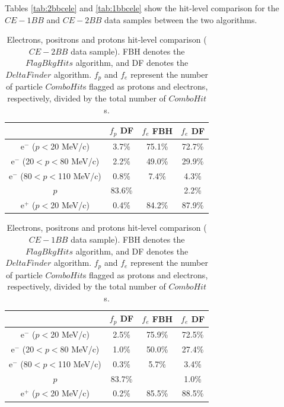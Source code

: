 Tables \ref{tab:2bbcele} and \ref{tab:1bbcele} show the hit-level 
comparison for the $CE-1BB$ and $CE-2BB$ data samples between the two algorithms.
\begin{center}
    \begin{table}[h!]
    \centering
    \renewcommand{\arraystretch}{1.}
    \begin{tabular}{| c | c | c | c |} 
    \hline
    &    $f_{p}$ DF & $f_{e}$ FBH  & $f_{e}$ DF \\
    \hline
    e$^-$ ($p<$20 MeV/c)      & 3.7\%   & 75.1\% & 72.7\%\\
    \hline
    e$^-$ (20$<p<$80 MeV/c)  & 2.2\%   & 49.0\%& 29.9\%\\
    \hline
    e$^-$ (80$<p<$110 MeV/c)  & 0.8\%  &  7.4\%& 4.3\%\\
    \hline
    $p$       &  83.6\%  &  & 2.2\%\\
    \hline
    e$^+$ ($p<$20 MeV/c) & 0.4\%    &   84.2\%& 87.9\%\\
    \hline
    \end{tabular}
    \caption[Electrons, 
    positrons and protons hit-level comparison.]{Electrons, 
    positrons and protons hit-level comparison ($CE-2BB$ data sample). FBH denotes 
    the $FlagBkgHits$ algorithm, and DF denotes the $DeltaFinder$ algorithm. $f_p$ and $f_e$ represent 
    the number of particle $ComboHit$s flagged as protons and electrons, respectively, 
    divided by the total number of $ComboHit$s.
    }
    \end{table}\label{tab:2bbcele}
    \end{center}

    \begin{center}
    \begin{table}[h!]
    \centering
    \renewcommand{\arraystretch}{1.}
    \begin{tabular}{| c | c | c | c |} 
    \hline
   &  $f_{p}$ DF & $f_{e}$ FBH  & $f_{e}$ DF \\
    \hline
    e$^-$ ($p<$20 MeV/c)     & 2.5\%   & 75.9\% & 72.5\%\\
    \hline
    e$^-$ (20$<p<$80 MeV/c)  & 1.0\%   & 50.0\%& 27.4\%\\
    \hline
    e$^-$ (80$<p<$110 MeV/c)   & 0.3\%  &  5.7\%& 3.4\%\\
    \hline
    $p$                 &         83.7\%   &  & 1.0\%\\
    \hline
    e$^+$ ($p<$20 MeV/c)    & 0.2\%    &   85.5\%& 88.5\%\\
    \hline
    \end{tabular}
    \caption[Electrons, positrons and protons hit-level comparison.]{Electrons, 
    positrons and protons hit-level comparison ($CE-1BB$ data sample). FBH denotes 
    the $FlagBkgHits$ algorithm, and DF denotes the $DeltaFinder$ algorithm. $f_p$ and $f_e$ represent 
    the number of particle $ComboHit$s flagged as protons and electrons, respectively, 
    divided by the total number of $ComboHit$s.}
    \end{table}\label{tab:1bbcele}
    \end{center}
  
